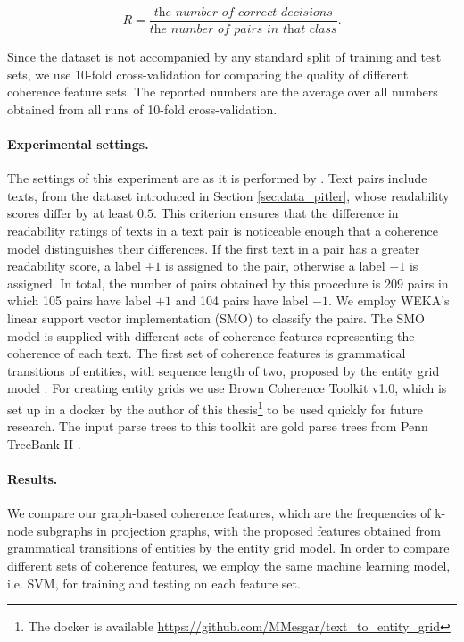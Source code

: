 \begin{equation}
R = \frac{\textit{the number of correct decisions}}{\textit{the number of pairs in that class}}.
\end{equation}

Since the dataset is not accompanied by any standard split of training and test sets, we use 10-fold cross-validation for comparing the quality of different coherence feature sets. 
The reported numbers are the average over all numbers obtained from all runs of \mbox{10-fold} \mbox{cross-validation}. 

\paragraph{Experimental settings.}
The settings of this experiment are as it is performed by . 
Text pairs include texts, from the dataset introduced in Section \ref{sec:data_pitler}, whose readability scores differ by at least $0.5$. 
This criterion ensures that the difference in readability ratings of texts in a text pair is noticeable enough that a coherence model distinguishes their differences. 
If the first text in a pair has a greater readability score, a label $+1$ is assigned to the pair, otherwise a label $-1$ is assigned. 
In total, the number of pairs obtained by this procedure is 209 pairs in which 105 pairs have label $+1$  and 104 pairs have label $-1$.  
We employ WEKA's linear support vector implementation (SMO) to classify the pairs.
The SMO model is supplied with different sets of coherence features representing the coherence of each text. 
The first set of coherence features is grammatical transitions of entities, with sequence length of two, proposed by the entity grid model \cite{barzilay05a,barzilay08}. 
For creating entity grids we use Brown Coherence Toolkit v1.0, which is set up in a docker by the author of this thesis\footnote{The docker is available \url{https://github.com/MMesgar/text_to_entity_grid}} to be used quickly for future research. 
The input parse trees to this toolkit are gold parse trees from Penn TreeBank II \cite{marcus94}. 

\paragraph{Results.}
We compare our graph-based coherence features, which are the frequencies of \mbox{k-node} subgraphs in projection graphs, with the proposed features obtained from grammatical transitions of entities by the entity grid model. 
In order to compare different sets of coherence features, we employ the same machine learning model, i.e. SVM, for training and testing on each feature set. 

